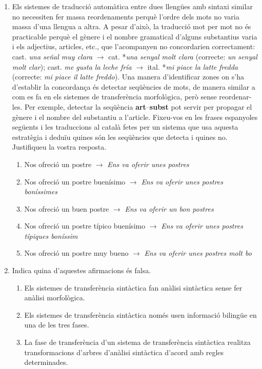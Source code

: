 \begin{enumerate}
    \item \label{ex:postres} Els sistemes de traducció automàtica entre dues llengües amb
      sintaxi similar no necessiten fer massa reordenaments perquè
      l'ordre dels mots no varia massa d'una llengua a altra. A pesar
      d'això, la traducció mot per mot no és practicable perquè el
      gènere i el nombre gramatical d'alguns substantius varia i els
      adjectius, articles, etc., que l'acompanyen no concordarien
      correctament: cast. {\em una señal muy clara\/} $\rightarrow$
      cat. *{\em una senyal molt clara} (correcte: {\em un senyal molt
        clar\/}); cast. {\em me gusta la leche fría} $\rightarrow$
      ital. *{\em mi piace la latte fredda\/} (correcte: {\em mi piace
        il latte freddo}). Una manera d'identificar zones on s'ha
      d'establir la concordança és detectar seqüències de mots, de
      manera similar a com es fa en els sistemes de transferència
      morfològica, però sense reordenar-les. Per exemple, detectar la
      seqüència {\bf art}--{\bf subst} pot servir per propagar el
      gènere i el nombre del substantiu a l'article. Fixeu-vos en les
      frases espanyoles següents i les traduccions al català fetes
      per un sistema que usa aquesta estratègia i deduïu quines són
      les seqüències que detecta i quines no. Justifiqueu la vostra
      resposta.
\begin{enumerate}
\item {\sf Nos ofreció un postre} $\rightarrow$ {\em Ens va oferir unes
    postres\/}
\item {\sf Nos ofreció un postre buenísimo} $\rightarrow$ {\em Ens va
    oferir unes postres boníssimes\/}
\item {\sf Nos ofreció un buen postre} $\rightarrow$ {\em *Ens va
    oferir un bon postres\/}
\item {\sf Nos ofreció un postre típico buenísimo\/} $\rightarrow$
  {\em *Ens va oferir unes postres típiques boníssim\/}
\item {\sf Nos ofreció un postre muy bueno} $\rightarrow$ {\em *Ens va
    oferir unes postres molt bo\/}
\end{enumerate}

\item 
   Indica quina d'aquestes afirmacions és falsa.
   
\begin{enumerate}
\item Els sistemes de transferència sintàctica fan
     anàlisi sintàctica sense fer anàlisi morfològica.
\item Els sistemes de transferència sintàctica només usen
     informació bilingüe en una de les tres fases.
\item La fase de transferència d'un sistema de transferència
     sintàctica realitza transformacions d'arbres d'anàlisi sintàctica
     d'acord amb regles determinades.
\end{enumerate}



\end{enumerate}
